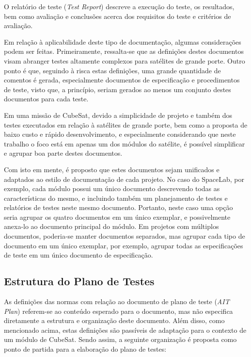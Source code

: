 O relatório de teste (\textit{Test Report}) descreve a execução do teste, os resultados, bem como avaliação e conclusões acerca dos requisitos do teste e critérios de avaliação.


Em relação à aplicabilidade deste tipo de documentação, algumas considerações podem ser feitas.
Primeiramente, ressalta-se que as definições destes documentos visam abranger testes altamente complexos para satélites de grande porte.
Outro ponto é que, seguindo à risca estas definições, uma grande quantidade de comentos é gerada, especialmente documentos de especificação e procedimentos de teste, visto que, a princípio, seriam gerados ao menos um conjunto destes documentos para cada teste.

Em uma missão de CubeSat, devido a simplicidade de projeto e também dos testes executados em relação à satélites de grande porte, bem como a proposta de baixo custo e rápido desenvolvimento, e especialmente considerando que neste trabalho o foco está em apenas um dos módulos do satélite, é possível simplificar e agrupar boa parte destes documentos.

Com isto em mente, é proposto que estes documentos sejam unificados e adaptados ao estilo de documentação de cada projeto.
No caso do SpaceLab, por exemplo, cada módulo possui um único documento descrevendo todas as características do mesmo, e incluindo também um planejamento de testes e relatórios de testes neste mesmo documento. Portanto, neste caso uma opção seria agrupar os quatro documentos em um único exemplar, e possivelmente anexa-lo ao documento principal do módulo.
Em projetos com múltiplos documentos, poderia-se manter documentos separados, mas agrupar cada tipo de documento em um único exemplar, por exemplo, agrupar todas as especificações de teste em um único documento de especificação.


\subsection{Estrutura do Plano de Testes} \label{sec:estrutura-plano-testes}


As definições das normas com relação ao documento de plano de teste (\textit{AIT Plan}) referem-se ao conteúdo esperado para o documento, mas não especifica diretamente a estrutura e organização deste documento.
Além disso, como mencionado acima, estas definições são passíveis de adaptação para o contexto de um módulo de CubeSat.
Sendo assim, a seguinte organização é proposta como ponto de partida para a elaboração do plano de testes:

